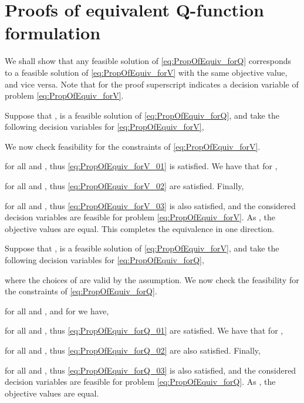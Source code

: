 \documentclass[journal]{IEEEtran}
\newcommand{\textQ}{Q}
\begin{document}
\section{Proofs of equivalent \textQ-function formulation} \label{app:Qform_equivalence}


\begin{IEEEproof}
	
	We shall show that any feasible solution of \eqref{eq:PropOfEquiv_forQ} corresponds to a feasible solution of \eqref{eq:PropOfEquiv_forV} with the same objective value, and vice versa.
Note that for the proof superscript  indicates a decision variable of problem \eqref{eq:PropOfEquiv_forV}.
	
	Suppose that  ,  is a feasible solution of \eqref{eq:PropOfEquiv_forQ}, and take the following decision variables for \eqref{eq:PropOfEquiv_forV},

We now check feasibility for the constraints of \eqref{eq:PropOfEquiv_forV}.

for all  and , thus \eqref{eq:PropOfEquiv_forV_01} is satisfied. We have that for ,
		
for all  and , thus \eqref{eq:PropOfEquiv_forV_02} are satisfied. Finally,

for all  and , thus \eqref{eq:PropOfEquiv_forV_03} is also satisfied, and the considered decision variables are feasible for problem \eqref{eq:PropOfEquiv_forV}. As , the objective values are equal. This completes the equivalence in one direction.
	
	Suppose that ,  is a feasible solution of \eqref{eq:PropOfEquiv_forV}, and take the following decision variables for \eqref{eq:PropOfEquiv_forQ},

where the choices of  are valid by the assumption.
We now check the feasibility for the constraints of \eqref{eq:PropOfEquiv_forQ}.

for all  and , and for   we have,

for all  and , thus \eqref{eq:PropOfEquiv_forQ_01} are satisfied. We have that for ,

for all  and , thus \eqref{eq:PropOfEquiv_forQ_02} are also satisfied. Finally,

for all  and , thus \eqref{eq:PropOfEquiv_forQ_03} is also satisfied, and the considered decision variables are feasible for problem \eqref{eq:PropOfEquiv_forQ}. As , the objective values are equal.
\end{IEEEproof}
\end{document}

